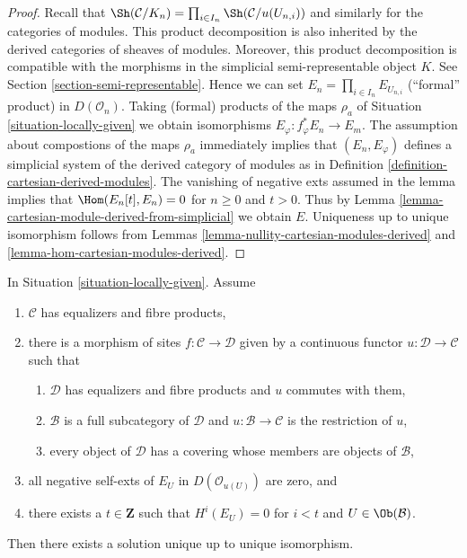 \begin{proof}
Recall that
$\Sh(\mathcal{C}/K_n) = \prod_{i \in I_n} \Sh(\mathcal{C}/u(U_{n, i}))$
and similarly for the categories of modules. This product decomposition
is also inherited by the derived categories of sheaves of modules.
Moreover, this product decomposition is compatible with
the morphisms in the simplicial semi-representable object $K$.
See Section \ref{section-semi-representable}.
Hence we can set $E_n = \prod_{i \in I_n} E_{U_{n, i}}$
(``formal'' product) in $D(\mathcal{O}_n)$.
Taking (formal) products of the maps $\rho_a$ of
Situation \ref{situation-locally-given}
we obtain isomorphisms $E_\varphi : f_\varphi^*E_n \to E_m$.
The assumption about compostions of the maps $\rho_a$
immediately implies that $(E_n, E_\varphi)$
defines a simplicial system of the derived category of modules
as in Definition \ref{definition-cartesian-derived-modules}.
The vanishing of negative exts assumed in the lemma implies that
$\Hom(E_n[t], E_n) = 0$ for $n \geq 0$ and $t > 0$.
Thus by
Lemma \ref{lemma-cartesian-module-derived-from-simplicial}
we obtain $E$.
Uniqueness up to unique isomorphism follows from
Lemmas \ref{lemma-nullity-cartesian-modules-derived} and
\ref{lemma-hom-cartesian-modules-derived}.
\end{proof}

\begin{lemma}
\label{lemma-bbd-glueing}
In Situation \ref{situation-locally-given}. Assume
\begin{enumerate}
\item $\mathcal{C}$ has equalizers and fibre products,
\item there is a morphism of sites $f : \mathcal{C} \to \mathcal{D}$
given by a continuous functor $u : \mathcal{D} \to \mathcal{C}$
such that
\begin{enumerate}
\item $\mathcal{D}$ has equalizers and fibre products and $u$
commutes with them,
\item $\mathcal{B}$ is a full subcategory of $\mathcal{D}$
and $u : \mathcal{B} \to \mathcal{C}$ is the restriction of $u$,
\item every object of $\mathcal{D}$ has a covering whose members
are objects of $\mathcal{B}$,
\end{enumerate}
\item all negative self-exts of $E_U$ in $D(\mathcal{O}_{u(U)})$ are zero, and
\item there exists a $t \in \mathbf{Z}$ such that $H^i(E_U) = 0$ for $i < t$
and $U \in \Ob(\mathcal{B})$.
\end{enumerate}
Then there exists a solution unique up to unique isomorphism.
\end{lemma}

